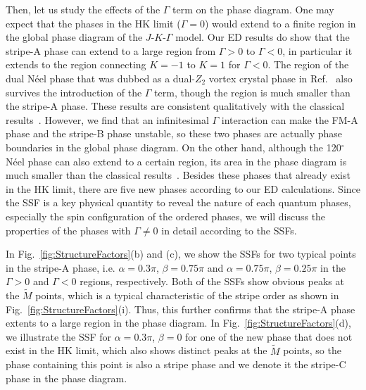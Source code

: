 \documentclass[aps,prb,reprint,amsfonts,amsmath,amssymb,showpacs,groupedaddress,superscriptaddress]{revtex4-1}
\begin{document}
Then, let us study the effects of the $\Gamma$ term on the phase diagram. One may expect that the phases in the HK limit ($\Gamma=0$) would extend to a finite region in the global phase diagram of the $J$-$K$-$\Gamma$ model. Our ED results do show that the stripe-A phase can extend to a large region from $\Gamma>0$ to $\Gamma<0$, in particular it extends to the region connecting $K=-1$ to $K=1$ for $\Gamma<0$. The region of the dual N\'{e}el phase that was dubbed as a dual-$Z_{2}$ vortex crystal phase in Ref.~ also survives
the introduction of the $\Gamma$ term, though the region is much smaller than the stripe-A phase. These results
are consistent qualitatively with the classical results~\cite{PhysRevB.92.165108}. However, we find that an infinitesimal $\Gamma$ interaction can make the FM-A phase and the stripe-B phase unstable, so these two phases are actually phase boundaries in the global phase diagram. On the other hand, although the 120$^\circ$ N\'{e}el phase can also extend to a certain region, its area in the phase diagram is much smaller than the classical results~\cite{PhysRevB.92.165108}. Besides these phases that already exist in the HK limit, there are five new phases according to our ED calculations. Since the SSF is a key physical quantity to reveal the nature of each quantum phases, especially the spin configuration of the ordered phases, we will discuss the properties of the phases with $\Gamma\neq0$ in detail according to the SSFs.

In Fig.~\ref{fig:StructureFactors}(b) and (c), we show the SSFs for two typical points in the stripe-A phase, i.e. $\alpha=0.3\pi$, $\beta=0.75\pi$ and $\alpha=0.75\pi$, $\beta=0.25\pi$ in the $\Gamma>0$ and $\Gamma<0$ regions, respectively. Both of the SSFs show obvious peaks at the $\tilde{M}$ points, which is a typical characteristic of the stripe order as shown in Fig.~\ref{fig:StructureFactors}(i). Thus, this further confirms that the stripe-A phase extents to a large region in the phase diagram. In Fig.~\ref{fig:StructureFactors}(d), we illustrate the SSF for $\alpha=0.3\pi$, $\beta=0$ for one of the new phase that does not exist in the HK limit, which also shows distinct peaks at the $\tilde{M}$ points, so the phase containing this point is also a stripe phase and we denote it the stripe-C phase in the phase diagram.
\end{document}
